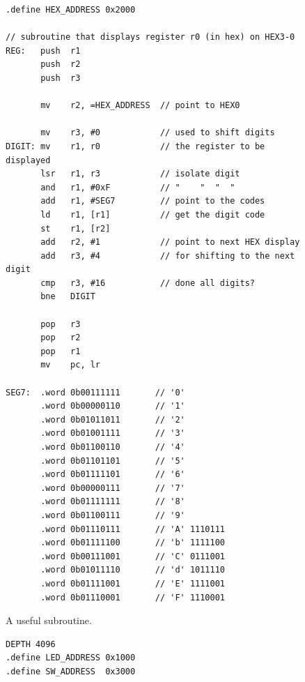 \documentclass[epsfig,10pt,fullpage]{article} \addtolength{\textwidth}{1.5in}
\begin{document}
\begin{enumerate}
\lstset{language=ASM,numbers=none,escapechar=|}
\begin{figure}[H]
\begin{center}
\begin{minipage}[h]{12.5 cm}
\begin{lstlisting}[name=proc]
.define HEX_ADDRESS 0x2000

// subroutine that displays register r0 (in hex) on HEX3-0 
REG:   push  r1
       push  r2
       push  r3

       mv    r2, =HEX_ADDRESS  // point to HEX0

       mv    r3, #0            // used to shift digits
DIGIT: mv    r1, r0            // the register to be displayed
       lsr   r1, r3            // isolate digit
       and   r1, #0xF          // "    "  "  "
       add   r1, #SEG7         // point to the codes
       ld    r1, [r1]          // get the digit code
       st    r1, [r2]
       add   r2, #1            // point to next HEX display
       add   r3, #4            // for shifting to the next digit
       cmp   r3, #16           // done all digits?
       bne   DIGIT
       
       pop   r3
       pop   r2
       pop   r1
       mv    pc, lr

SEG7:  .word 0b00111111       // '0'
       .word 0b00000110       // '1'
       .word 0b01011011       // '2'
       .word 0b01001111       // '3'
       .word 0b01100110       // '4'
       .word 0b01101101       // '5'
       .word 0b01111101       // '6'
       .word 0b00000111       // '7'
       .word 0b01111111       // '8'
       .word 0b01100111       // '9'
       .word 0b01110111       // 'A' 1110111
       .word 0b01111100       // 'b' 1111100
       .word 0b00111001       // 'C' 0111001
       .word 0b01011110       // 'd' 1011110
       .word 0b01111001       // 'E' 1111001
       .word 0b01110001       // 'F' 1110001
\end{lstlisting}
\end{minipage}
\caption{A useful subroutine.}
\label{fig:useful}
\end{center}
\end{figure}

\lstset{language=ASM,numbers=none,escapechar=|}
\begin{figure}[H]
\begin{center}
\begin{minipage}[h]{13 cm}
\begin{lstlisting}[name=proc]
DEPTH 4096
.define LED_ADDRESS 0x1000
.define SW_ADDRESS  0x3000


\end{lstlisting}
\end{minipage}
\end{center}
\end{figure}
\end{enumerate}
\end{document}

